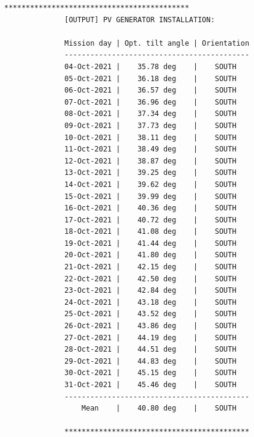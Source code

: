 \begin{lstfloat}
\begin{lstlisting}[numbers = none, caption = {Output of the \MATLAB simulation in appendix \ref{sec:matlab_code} regarding the installation of the PV generator for the mission inputs in the table \ref{tab:table_negev}.}, label = lst:list_negev_1, captionpos = b]
              *******************************************
              [OUTPUT] PV GENERATOR INSTALLATION:

              Mission day | Opt. tilt angle | Orientation
              -------------------------------------------
              04-Oct-2021 |    35.78 deg    |    SOUTH
              05-Oct-2021 |    36.18 deg    |    SOUTH
              06-Oct-2021 |    36.57 deg    |    SOUTH
              07-Oct-2021 |    36.96 deg    |    SOUTH
              08-Oct-2021 |    37.34 deg    |    SOUTH
              09-Oct-2021 |    37.73 deg    |    SOUTH
              10-Oct-2021 |    38.11 deg    |    SOUTH
              11-Oct-2021 |    38.49 deg    |    SOUTH
              12-Oct-2021 |    38.87 deg    |    SOUTH
              13-Oct-2021 |    39.25 deg    |    SOUTH
              14-Oct-2021 |    39.62 deg    |    SOUTH
              15-Oct-2021 |    39.99 deg    |    SOUTH
              16-Oct-2021 |    40.36 deg    |    SOUTH
              17-Oct-2021 |    40.72 deg    |    SOUTH
              18-Oct-2021 |    41.08 deg    |    SOUTH
              19-Oct-2021 |    41.44 deg    |    SOUTH
              20-Oct-2021 |    41.80 deg    |    SOUTH
              21-Oct-2021 |    42.15 deg    |    SOUTH
              22-Oct-2021 |    42.50 deg    |    SOUTH
              23-Oct-2021 |    42.84 deg    |    SOUTH
              24-Oct-2021 |    43.18 deg    |    SOUTH
              25-Oct-2021 |    43.52 deg    |    SOUTH
              26-Oct-2021 |    43.86 deg    |    SOUTH
              27-Oct-2021 |    44.19 deg    |    SOUTH
              28-Oct-2021 |    44.51 deg    |    SOUTH
              29-Oct-2021 |    44.83 deg    |    SOUTH
              30-Oct-2021 |    45.15 deg    |    SOUTH
              31-Oct-2021 |    45.46 deg    |    SOUTH
              -------------------------------------------
                  Mean    |    40.80 deg    |    SOUTH

              *******************************************
\end{lstlisting}
\end{lstfloat}
